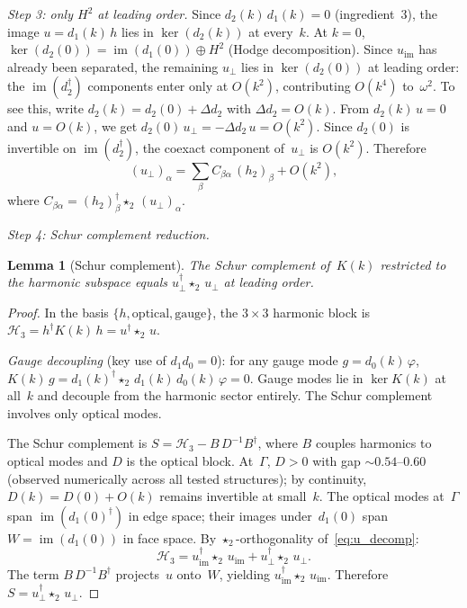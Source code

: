 \documentclass[preprint,12pt]{elsarticle}
\newtheorem{lemma}[theorem]{Lemma}
\DeclareMathOperator{\im}{im}
\begin{document}
\emph{Step 3: only $H^2$ at leading order.}
Since $d_2(k)\, d_1(k) = 0$ (ingredient~3), the image
$u = d_1(k)\, h$ lies in $\ker(d_2(k))$ at every~$k$. At $k = 0$,
$\ker(d_2(0)) = \im(d_1(0)) \oplus H^2$ (Hodge decomposition). Since
$u_{\mathrm{im}}$ has already been separated, the remaining $u_\perp$ lies
in $\ker(d_2(0))$ at leading order: the $\im(d_2^\dagger)$ components
enter only at $O(k^2)$, contributing $O(k^4)$ to~$\omega^2$.
To see this, write $d_2(k) = d_2(0) + \Delta d_2$ with
$\Delta d_2 = O(k)$. From $d_2(k)\, u = 0$ and $u = O(k)$,
we get $d_2(0)\, u_\perp = -\Delta d_2\, u = O(k^2)$. Since $d_2(0)$
is invertible on $\im(d_2^\dagger)$, the coexact component of~$u_\perp$
is $O(k^2)$.
Therefore
\begin{equation}
  (u_\perp)_\alpha = \sum_\beta C_{\beta\alpha}\, (h_2)_\beta + O(k^2),
  \label{eq:u_perp_H2}
\end{equation}
where $C_{\beta\alpha} = (h_2)_\beta^\dagger \star_2\, (u_\perp)_\alpha$.

\emph{Step 4: Schur complement reduction.}

\begin{lemma}[Schur complement]
\label{lem:schur}
The Schur complement of~$K(k)$ restricted to the harmonic subspace equals
$u_\perp^\dagger \star_2\, u_\perp$ at leading order.
\end{lemma}

\begin{proof}
In the basis $\{h, \text{optical}, \text{gauge}\}$, the $3 \times 3$
harmonic block is
$\mathcal{H}_3 = h^\dagger K(k)\, h = u^\dagger \star_2\, u$.

\emph{Gauge decoupling} (key use of $d_1 d_0 = 0$):
for any gauge mode $g = d_0(k)\, \varphi$,
$K(k)\, g = d_1(k)^\dagger \star_2\, d_1(k)\, d_0(k)\, \varphi = 0$.
Gauge modes lie in $\ker K(k)$ at all~$k$ and decouple from the harmonic
sector entirely. The Schur complement involves only optical modes.

The Schur complement is
$S = \mathcal{H}_3 - B\, D^{-1} B^\dagger$,
where $B$ couples harmonics to optical modes and $D$ is the optical block.
At~$\Gamma$, $D > 0$ with gap $\sim 0.54$--$0.60$ (observed numerically
across all tested structures); by continuity,
$D(k) = D(0) + O(k)$ remains invertible at small~$k$.
The optical modes at~$\Gamma$ span $\im(d_1(0)^\dagger)$ in edge space;
their images under~$d_1(0)$ span $W = \im(d_1(0))$ in face space.
By $\star_2$-orthogonality of~\eqref{eq:u_decomp}:
\[
  \mathcal{H}_3 = u_{\mathrm{im}}^\dagger \star_2\, u_{\mathrm{im}}
  + u_\perp^\dagger \star_2\, u_\perp.
\]
The term $B\, D^{-1} B^\dagger$ projects~$u$ onto~$W$, yielding
$u_{\mathrm{im}}^\dagger \star_2\, u_{\mathrm{im}}$.
Therefore $S = u_\perp^\dagger \star_2\, u_\perp$.
\end{proof}
\end{document}
